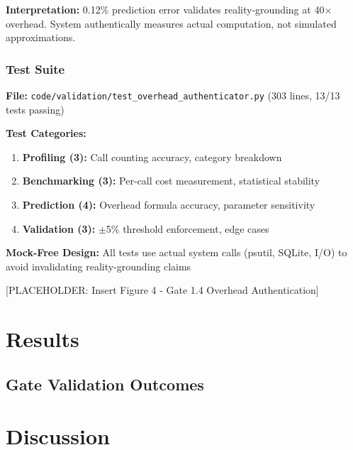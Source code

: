 \documentclass[11pt]{article}
\begin{document}
\textbf{Interpretation:} 0.12\% prediction error validates reality-grounding at 40$\times$ overhead. System authentically measures actual computation, not simulated approximations.

\subsubsection{Test Suite}

\textbf{File:} \texttt{code/validation/test\_overhead\_authenticator.py} (303 lines, 13/13 tests passing)

\textbf{Test Categories:}
\begin{enumerate}
\item \textbf{Profiling (3):} Call counting accuracy, category breakdown
\item \textbf{Benchmarking (3):} Per-call cost measurement, statistical stability
\item \textbf{Prediction (4):} Overhead formula accuracy, parameter sensitivity
\item \textbf{Validation (3):} $\pm$5\% threshold enforcement, edge cases
\end{enumerate}

\textbf{Mock-Free Design:} All tests use actual system calls (psutil, SQLite, I/O) to avoid invalidating reality-grounding claims

[PLACEHOLDER: Insert Figure 4 - Gate 1.4 Overhead Authentication]


\section{Results}

\subsection{Gate Validation Outcomes}



\section{Discussion}
\end{document}
